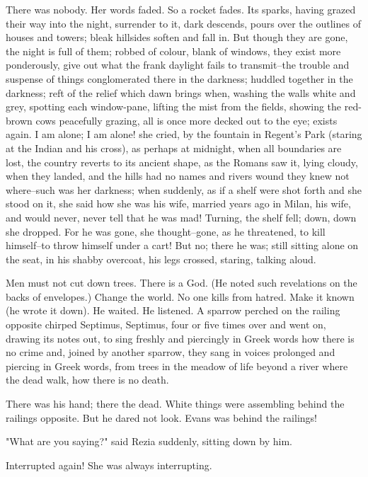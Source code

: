 \documentclass[lang=cn,10pt]{elegantbook}
\begin{document}
There was nobody.  Her words faded.  So a rocket fades.  Its
sparks, having grazed their way into the night, surrender to it,
dark descends, pours over the outlines of houses and towers; bleak
hillsides soften and fall in.  But though they are gone, the night
is full of them; robbed of colour, blank of windows, they exist
more ponderously, give out what the frank daylight fails to
transmit--the trouble and suspense of things conglomerated there in
the darkness; huddled together in the darkness; reft of the relief
which dawn brings when, washing the walls white and grey, spotting
each window-pane, lifting the mist from the fields, showing the
red-brown cows peacefully grazing, all is once more decked out to
the eye; exists again.  I am alone; I am alone! she cried, by the
fountain in Regent's Park (staring at the Indian and his cross), as
perhaps at midnight, when all boundaries are lost, the country
reverts to its ancient shape, as the Romans saw it, lying cloudy,
when they landed, and the hills had no names and rivers wound they
knew not where--such was her darkness; when suddenly, as if a shelf
were shot forth and she stood on it, she said how she was his wife,
married years ago in Milan, his wife, and would never, never tell
that he was mad!  Turning, the shelf fell; down, down she dropped.
For he was gone, she thought--gone, as he threatened, to kill
himself--to throw himself under a cart!  But no; there he was;
still sitting alone on the seat, in his shabby overcoat, his legs
crossed, staring, talking aloud.

Men must not cut down trees.  There is a God.  (He noted such
revelations on the backs of envelopes.)  Change the world.  No one
kills from hatred.  Make it known (he wrote it down).  He waited.
He listened.  A sparrow perched on the railing opposite chirped
Septimus, Septimus, four or five times over and went on, drawing
its notes out, to sing freshly and piercingly in Greek words how
there is no crime and, joined by another sparrow, they sang in
voices prolonged and piercing in Greek words, from trees in the
meadow of life beyond a river where the dead walk, how there is no
death.

There was his hand; there the dead.  White things were assembling
behind the railings opposite.  But he dared not look.  Evans was
behind the railings!

"What are you saying?" said Rezia suddenly, sitting down by him.

Interrupted again!  She was always interrupting.
\end{document}
